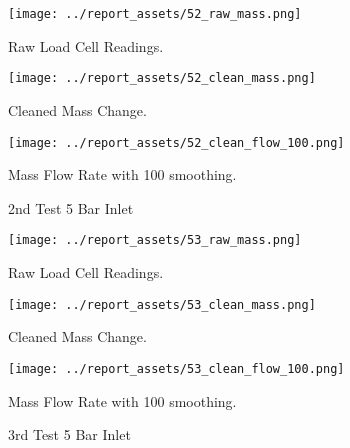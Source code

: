 \begin{figure}[htbp]
    \centering

    \begin{minipage}{0.3\textwidth}
        \centering
        \texttt{[image: ../report\_assets/52\_raw\_mass.png]}
        \caption*{Raw Load Cell Readings.}
    \end{minipage}
    \hfill
    \begin{minipage}{0.3\textwidth}
        \centering
        \texttt{[image: ../report\_assets/52\_clean\_mass.png]}
        \caption*{Cleaned Mass Change.}
    \end{minipage}
    \hfill
    \begin{minipage}{0.3\textwidth}
        \centering
        \texttt{[image: ../report\_assets/52\_clean\_flow\_100.png]}
        \caption*{Mass Flow Rate with 100 smoothing.}
    \end{minipage}
    \caption{2nd Test 5 Bar Inlet}
    
\end{figure}\label{fig:52}

\begin{figure}[htbp]
    \centering

    \begin{minipage}{0.3\textwidth}
        \centering
        \texttt{[image: ../report\_assets/53\_raw\_mass.png]}
        \caption*{Raw Load Cell Readings.}
    \end{minipage}
    \hfill
    \begin{minipage}{0.3\textwidth}
        \centering
        \texttt{[image: ../report\_assets/53\_clean\_mass.png]}
        \caption*{Cleaned Mass Change.}
    \end{minipage}
    \hfill
    \begin{minipage}{0.3\textwidth}
        \centering
        \texttt{[image: ../report\_assets/53\_clean\_flow\_100.png]}
        \caption*{Mass Flow Rate with 100 smoothing.}
    \end{minipage}
    \caption{3rd Test 5 Bar Inlet}
    
\end{figure}\label{fig:53}


